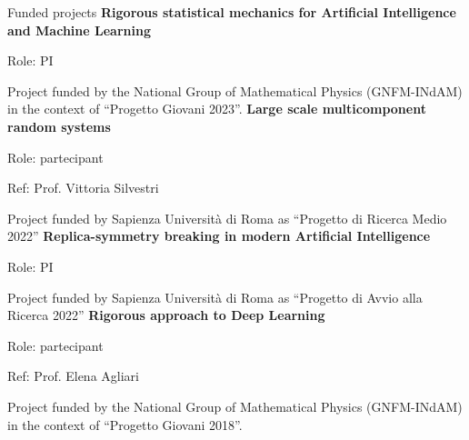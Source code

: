 \begin{rubric}{Funded projects}
\entry*[2023]
  \textbf{Rigorous statistical mechanics for Artificial Intelligence and Machine Learning}\par Role: PI\par Project funded by the National Group of Mathematical Physics (GNFM-INdAM) in the context of ``Progetto Giovani 2023''.
\entry*[2022]
  \textbf{Large scale multicomponent random systems}\par Role: partecipant\par Ref: Prof. Vittoria Silvestri\par Project funded by Sapienza Università di Roma as ``Progetto di Ricerca Medio 2022''
\entry*[2022]
  \textbf{Replica-symmetry breaking in modern Artificial Intelligence}\par Role: PI\par Project funded by Sapienza Università di Roma as ``Progetto di Avvio alla Ricerca 2022''
\entry*[2018]
  \textbf{Rigorous approach to Deep Learning}\par Role: partecipant\par Ref: Prof. Elena Agliari\par Project funded by the National Group of Mathematical Physics (GNFM-INdAM) in the context of ``Progetto Giovani 2018''.
\end{rubric}
